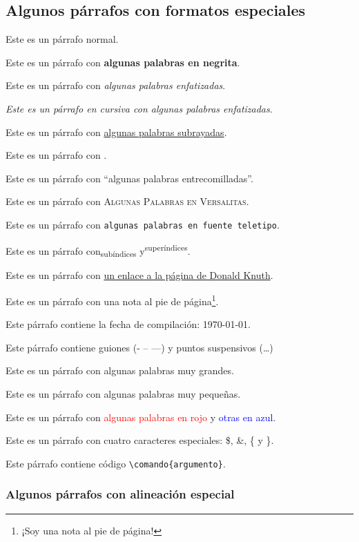 \documentclass[a4paper,10pt]{article}
\theoremstyle{teorema}
\theoremstyle{plano}
\theoremstyle{titulo}
\begin{document}
\subsection{Algunos párrafos con formatos especiales}

Este es un párrafo normal.

Este es un párrafo con \textbf{algunas palabras en negrita}.

Este es un párrafo con \emph{algunas palabras enfatizadas}.

{\itshape Este es un párrafo en cursiva con \emph{algunas palabras} enfatizadas}.

Este es un párrafo con \underline{algunas palabras subrayadas}.

Este es un párrafo con .

Este es un párrafo con ``algunas palabras entrecomilladas''.

Este es un párrafo con \textsc{Algunas Palabras en Versalitas}.

Este es un párrafo con \texttt{algunas palabras en fuente teletipo}.

Este es un párrafo con\textsubscript{subíndices} y\textsuperscript{superíndices}.

Este es un párrafo con \href{https://www-cs-faculty.stanford.edu/~knuth/}{un enlace a la página de Donald Knuth}.

Este es un párrafo con una nota al pie de página\footnote{¡Soy una nota al pie de página!}.

Este párrafo contiene la fecha de compilación: \today.

Este párrafo contiene guiones (- -- ---) y puntos suspensivos (\ldots)

Este es un párrafo con {\Large algunas palabras muy grandes}.

Este es un párrafo con {\scriptsize algunas palabras muy pequeñas}.

Este es un párrafo con \textcolor{red}{algunas palabras en rojo} y \textcolor{blue}{otras en azul}.

Este es un párrafo con cuatro caracteres especiales: \$, \&, \{ y \}. 

Este párrafo contiene código \verb|\comando{argumento}|.


\subsubsection{Algunos párrafos con alineación especial}
\end{document}
